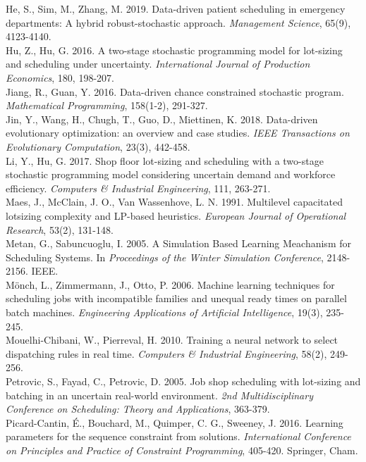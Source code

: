 \documentclass[letterpaper]{article} %
\begin{document}
He, S., Sim, M., Zhang, M. 2019. Data-driven patient scheduling in emergency departments: A hybrid robust-stochastic approach.  \textit{Management Science}, 65(9), 4123-4140.\\
Hu, Z., Hu, G. 2016. A two-stage stochastic programming model for lot-sizing and scheduling under uncertainty.  \textit{International Journal of Production Economics}, 180, 198-207.\\
Jiang, R., Guan, Y. 2016. Data-driven chance constrained stochastic program.  \textit{Mathematical Programming}, 158(1-2), 291-327.\\
Jin, Y., Wang, H., Chugh, T., Guo, D., Miettinen, K. 2018. Data-driven evolutionary optimization: an overview and case studies.  \textit{IEEE Transactions on Evolutionary Computation}, 23(3), 442-458.\\
Li, Y., Hu, G. 2017. Shop floor lot-sizing and scheduling with a two-stage stochastic programming model considering uncertain demand and workforce efficiency.  \textit{Computers \& Industrial Engineering}, 111, 263-271.\\
Maes, J., McClain, J. O., Van Wassenhove, L. N. 1991. Multilevel capacitated lotsizing complexity and LP-based heuristics.  \textit{European Journal of Operational Research}, 53(2), 131-148.\\
Metan, G., Sabuncuoglu, I. 2005. A Simulation Based Learning Meachanism for Scheduling Systems. In  \textit{Proceedings of the Winter Simulation Conference}, 2148-2156. IEEE.\\
Mönch, L., Zimmermann, J., Otto, P. 2006. Machine learning techniques for scheduling jobs with incompatible families and unequal ready times on parallel batch machines.  \textit{Engineering Applications of Artificial Intelligence}, 19(3), 235-245.\\
Mouelhi-Chibani, W., Pierreval, H. 2010. Training a neural network to select dispatching rules in real time.  \textit{Computers \& Industrial Engineering}, 58(2), 249-256.\\
Petrovic, S., Fayad, C., Petrovic, D. 2005. Job shop scheduling with lot-sizing and batching in an uncertain real-world environment.  \textit{2nd Multidisciplinary Conference on Scheduling: Theory and Applications}, 363-379.\\
Picard-Cantin, É., Bouchard, M., Quimper, C. G., Sweeney, J. 2016. Learning parameters for the sequence constraint from solutions. \textit{International Conference on Principles and Practice of Constraint Programming}, 405-420. Springer, Cham.\\
\end{document}
